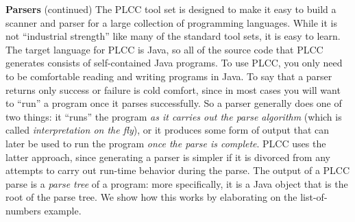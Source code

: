 \begin{minipage}[t]{\sw}
\slidenumber
\LARGE
{\bf Parsers} (continued)\exx
The PLCC tool set is designed
to make it easy to build a scanner and parser
for a large collection of programming languages.
While it is not ``industrial strength'' like many of the standard tool sets,
it is easy to learn.
The target language for PLCC is Java,
so all of the source code that PLCC generates
consists of self-contained Java programs.
To use PLCC, you only need to be comfortable
reading and writing programs in Java.\exx
To say that a parser returns only success or failure
is cold comfort,
since in most cases you will want to ``run'' a program
once it parses successfully.
So a parser generally does one of two things:
it ``runs'' the program {\em as it carries out the parse algorithm}
(which is called {\em interpretation on the fly}),
or it produces some form of output
that can later be used to run the program {\em once the parse is complete}.
PLCC uses the latter approach,
since generating a parser is simpler
if it is divorced from any attempts to carry out
run-time behavior during the parse.\exx
The output of a PLCC parse is a {\em parse tree} of a program:
more specifically, it is a Java object
that is the root of the parse tree.
We show how this works by elaborating
on the list-of-numbers example.\exx
\end{minipage}
\clearpage
